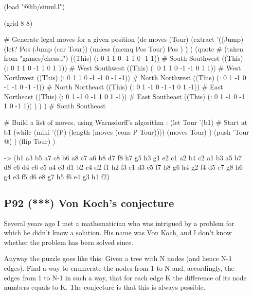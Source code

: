 \begin{wideverbatim}

(load "@lib/simul.l")

(grid 8 8)

# Generate legal moves for a given position
(de moves (Tour)
   (extract
      '((Jump)
         (let? Pos (Jump (car Tour))
            (unless (memq Pos Tour)
               Pos ) ) )
      (quote  # (taken from "games/chess.l")
         ((This) (: 0 1  1  0 -1  1  0 -1  1))        # South Southwest
         ((This) (: 0 1  1  0 -1  1  0  1  1))        # West Southwest
         ((This) (: 0 1  1  0 -1 -1  0  1  1))        # West Northwest
         ((This) (: 0 1  1  0 -1 -1  0 -1 -1))        # North Northwest
         ((This) (: 0 1 -1  0 -1 -1  0 -1 -1))        # North Northeast
         ((This) (: 0 1 -1  0 -1 -1  0  1 -1))        # East Northeast
         ((This) (: 0 1 -1  0 -1  1  0  1 -1))        # East Southeast
         ((This) (: 0 1 -1  0 -1  1  0 -1  1)) ) ) )  # South Southeast

# Build a list of moves, using Warnsdorff's algorithm
: (let Tour '(b1)  # Start at b1
   (while
      (mini
         '((P) (length (moves (cons P Tour))))
         (moves Tour) )
      (push 'Tour @) )
   (flip Tour) )

-> (b1 a3 b5 a7 c8 b6 a8 c7 a6 b8 d7 f8 h7 g5 h3 g1 e2 c1 a2 b4 c2
   a1 b3 a5 b7 d8 c6 d4 e6 c5 a4 c3 d1 b2 c4 d2 f1 h2 f3 e1 d3 e5 f7
   h8 g6 h4 g2 f4 d5 e7 g8 h6 g4 e3 f5 d6 e8 g7 h5 f6 e4 g3 h1 f2)

\end{wideverbatim}

\pagebreak{}
\subsection*{{P92} (***) Von Koch's conjecture}
\label{sec:99-problems-P92}


Several years ago I met a mathematician who was intrigued by a problem
for which he didn't know a solution. His name was Von Koch, and I
don't know whether the problem has been solved since.

Anyway the puzzle goes like this: Given a tree with N nodes (and hence
N-1 edges). Find a way to enumerate the nodes from 1 to N and,
accordingly, the edges from 1 to N-1 in such a way, that for each edge
K the difference of its node numbers equals to
K. The conjecture is that this is always possible. 


